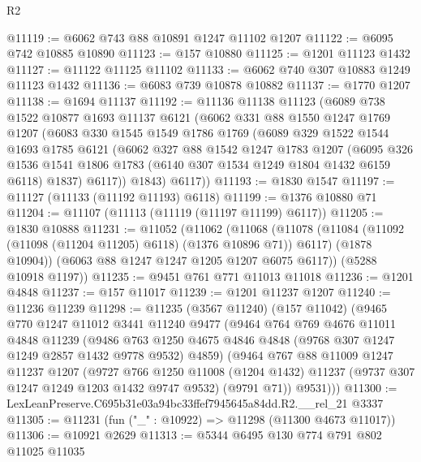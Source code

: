 \begin{lexlean}{R2}
\begin{coremodule}
@11119 := @6062 @743 @88 @10891 @1247 @11102 @1207
@11122 := @6095 @742 @10885 @10890
@11123 := @157 @10880
@11125 := @1201 @11123 @1432
@11127 := @11122 @11125 @11102
@11133 := @6062 @740 @307 @10883 @1249 @11123 @1432
@11136 := @6083 @739 @10878 @10882
@11137 := @1770 @1207
@11138 := @1694 @11137
@11192 := @11136
    @11138
    @11123
    (@6089
      @738
      @1522
      @10877
      @1693
      @11137
      @6121
      (@6062
        @331
        @88
        @1550
        @1247
        @1769
        @1207
        (@6083
          @330
          @1545
          @1549
          @1786
          @1769
          (@6089
            @329
            @1522
            @1544
            @1693
            @1785
            @6121
            (@6062
              @327
              @88
              @1542
              @1247
              @1783
              @1207
              (@6095
                @326
                @1536
                @1541
                @1806
                @1783
                (@6140 @307 @1534 @1249 @1804 @1432 @6159 @6118)
                @1837)
              @6117))
          @1843)
        @6117))
@11193 := @1830 @1547
@11197 := @11127 (@11133 (@11192 @11193) @6118)
@11199 := @1376 @10880 @71
@11204 := @11107 (@11113 (@11119 (@11197 @11199) @6117))
@11205 := @1830 @10888
@11231 := @11052
    (@11062
      (@11068
        (@11078
          (@11084 (@11092 (@11098 (@11204 @11205) @6118) (@1376 @10896 @71)) @6117)
          (@1878 @10904))
        (@6063 @88 @1247 @1247 @1205 @1207 @6075 @6117))
      (@5288 @10918 @1197))
@11235 := @9451 @761 @771 @11013 @11018
@11236 := @1201 @4848
@11237 := @157 @11017
@11239 := @1201 @11237 @1207
@11240 := @11236 @11239
@11298 := @11235
    (@3567 @11240)
    (@157 @11042)
    (@9465
      @770
      @1247
      @11012
      @3441
      @11240
      @9477
      (@9464
        @764
        @769
        @4676
        @11011
        @4848
        @11239
        (@9486 @763 @1250 @4675 @4846 @4848 (@9768 @307 @1247 @1249 @2857 @1432 @9778 @9532) @4859)
        (@9464
          @767
          @88
          @11009
          @1247
          @11237
          @1207
          (@9727
            @766
            @1250
            @11008
            (@1204 @1432)
            @11237
            (@9737 @307 @1247 @1249 @1203 @1432 @9747 @9532)
            (@9791 @71))
          @9531)))
@11300 := LexLeanPreserve.C695b31e03a94bc33ffef7945645a84dd.R2.__rel_21 @3337
@11305 := @11231 (fun ("_" : @10922) => @11298 (@11300 @4673 @11017))
@11306 := @10921 @2629
@11313 := @5344 @6495 @130 @774 @791 @802 @11025 @11035

\end{coremodule}
\end{lexlean}
